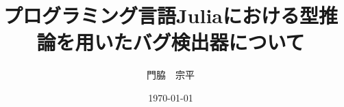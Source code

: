 \documentclass[uplatex, a4paper, 12pt]{jsarticle}
\begin{document}
\title{プログラミング言語Juliaにおける型推論を用いたバグ検出器について}
\author{門脇　宗平}
\date{\today}
\maketitle










\end{document}
